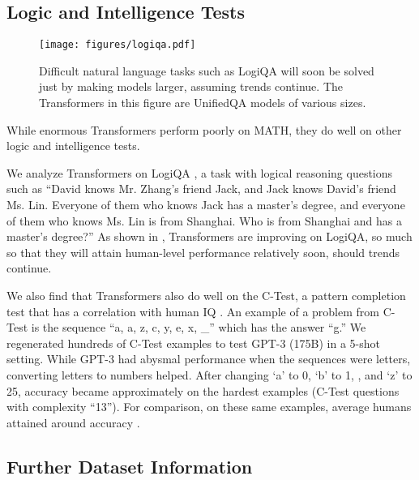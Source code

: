 \documentclass{article}
\begin{document}
\subsection{Logic and Intelligence Tests}\label{app:iq}

\begin{figure}[h]
    \centering
    \texttt{[image: figures/logiqa.pdf]}
    \caption{Difficult natural language tasks such as LogiQA will soon be solved just by making models larger, assuming trends continue. The Transformers in this figure are UnifiedQA \citep{khashabi2020unifiedqa} models of various sizes.}
    \label{fig:logiqa}
\end{figure}

While enormous Transformers perform poorly on MATH, they do well on other logic and intelligence tests.

We analyze Transformers on LogiQA \citep{Liu2020LogiQAAC}, a task with logical reasoning questions such as ``David knows Mr. Zhang's friend Jack, and Jack knows David's friend Ms. Lin. Everyone of them who knows Jack has a master's degree, and everyone of them who knows Ms. Lin is from Shanghai. Who is from Shanghai and has a master's degree?'' As shown in , Transformers are improving on LogiQA, so much so that they will attain human-level performance relatively soon, should trends continue. 

We also find that Transformers also do well on the C-Test, a pattern completion test that has a  correlation with human IQ \citep{HernndezOrallo2000BeyondTT}. An example of a problem from C-Test is the sequence ``a, a, z, c, y, e, x, \_'' which has the answer ``g.'' We regenerated hundreds of C-Test examples to test GPT-3 (175B) in a 5-shot setting. While GPT-3 had abysmal performance when the sequences were letters, converting letters to numbers helped. After changing `a' to 0, `b' to 1, , and `z' to 25, accuracy became approximately  on the hardest examples (C-Test questions with complexity ``13''). For comparison, on these same examples, average humans attained around  accuracy \citep{HernndezOrallo2000BeyondTT}.










\subsection{Further Dataset Information}\label{app:further_data_info}
\end{document}
